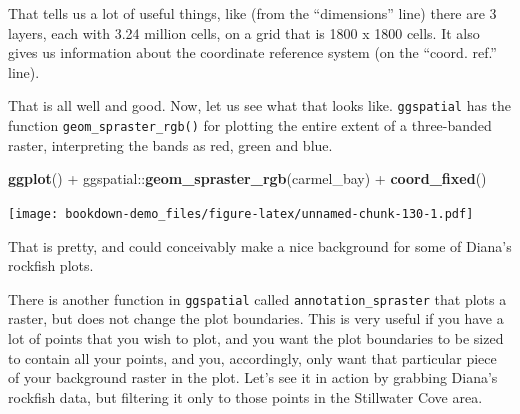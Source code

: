 \documentclass[]{book}
\newenvironment{Shaded}{\begin{snugshade}}{\end{snugshade}}
\newcommand{\KeywordTok}[1]{\textcolor[rgb]{0.13,0.29,0.53}{\textbf{{#1}}}}
\newcommand{\FloatTok}[1]{\textcolor[rgb]{0.00,0.00,0.81}{{#1}}}
\newcommand{\StringTok}[1]{\textcolor[rgb]{0.31,0.60,0.02}{{#1}}}
\newcommand{\NormalTok}[1]{{#1}}
\theoremstyle{definition}
\theoremstyle{definition}
\theoremstyle{remark}
\begin{document}
That tells us a lot of useful things, like (from the ``dimensions''
line) there are 3 layers, each with 3.24 million cells, on a grid that
is 1800 x 1800 cells. It also gives us information about the coordinate
reference system (on the ``coord. ref.'' line).

That is all well and good. Now, let us see what that looks like.
\texttt{ggspatial} has the function \texttt{geom\_spraster\_rgb()} for
plotting the entire extent of a three-banded raster, interpreting the
bands as red, green and blue.

\begin{Shaded}
\begin{Highlighting}[]
\KeywordTok{ggplot}\NormalTok{() +}
\StringTok{  }\NormalTok{ggspatial::}\KeywordTok{geom_spraster_rgb}\NormalTok{(carmel_bay) +}
\StringTok{  }\KeywordTok{coord_fixed}\NormalTok{()}
\end{Highlighting}
\end{Shaded}

\texttt{[image: bookdown-demo\_files/figure-latex/unnamed-chunk-130-1.pdf]}

That is pretty, and could conceivably make a nice background for some of
Diana's rockfish plots.

There is another function in \texttt{ggspatial} called
\texttt{annotation\_spraster} that plots a raster, but does not change
the plot boundaries. This is very useful if you have a lot of points
that you wish to plot, and you want the plot boundaries to be sized to
contain all your points, and you, accordingly, only want that particular
piece of your background raster in the plot. Let's see it in action by
grabbing Diana's rockfish data, but filtering it only to those points in
the Stillwater Cove area.

\begin{Shaded}
\end{Shaded}
\end{document}
